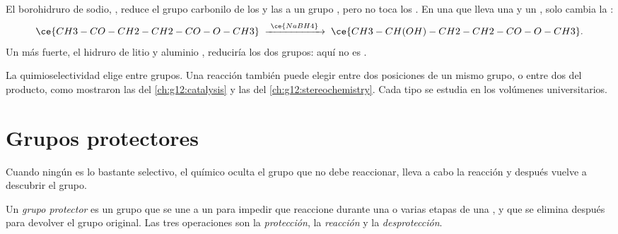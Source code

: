 \begin{example}\label{ex:g12:synthesis-strategy:nabh4}
El borohidruro de sodio, , reduce el grupo carbonilo de los
 y las  a un grupo , pero no toca los . En
una  que lleva una  y un , solo cambia la :
\[
  \ce{CH3-CO-CH2-CH2-CO-O-CH3}
  \;\xrightarrow{\ \ce{NaBH4}\ }\;
  \ce{CH3-CH(OH)-CH2-CH2-CO-O-CH3} .
\]
Un  más fuerte, el hidruro de litio y aluminio ,
reduciría los dos grupos: aquí no es .
\end{example}

\begin{remark}\label{rem:g12:synthesis-strategy:kinds}
La quimioselectividad elige entre grupos. Una reacción también puede
elegir entre dos posiciones de un mismo grupo, o entre dos
 del producto, como mostraron las  del
\cref{ch:g12:catalysis} y las   del
\cref{ch:g12:stereochemistry}. Cada tipo se estudia en los volúmenes
universitarios.
\end{remark}

\section{Grupos protectores}

Cuando ningún  es lo bastante selectivo, el químico oculta el
grupo que no debe reaccionar, lleva a cabo la reacción y después vuelve a
descubrir el grupo.

\begin{definition}\label{def:g12:synthesis-strategy:protecting-group}
Un \emph{grupo protector} es un grupo que se une a
un  para impedir que reaccione durante una o varias etapas
de una , y que se elimina después para devolver el grupo
original. Las tres operaciones son la \emph{protección}, la
\emph{reacción} y la \emph{desprotección}.
\end{definition}

